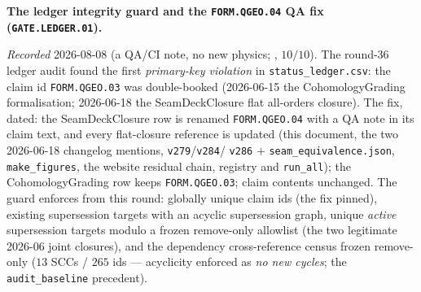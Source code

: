 \documentclass[11pt,a4paper]{article}
\begin{document}
\par\smallskip\noindent\textbf{The ledger integrity guard and
the \texttt{FORM.QGEO.04} QA fix (\texttt{GATE.LEDGER.01}).}
{\sloppy
\emph{Recorded} 2026-08-08 (a QA/CI note, no new physics;
, $10/10$).  The round-36
ledger audit found the first \emph{primary-key violation} in
\texttt{status\_ledger.csv}: the claim id \texttt{FORM.QGEO.03}
was double-booked (2026-06-15 the CohomologyGrading
formalisation; 2026-06-18 the SeamDeckClosure flat all-orders
closure).  The fix, dated: the SeamDeckClosure row is renamed
\texttt{FORM.QGEO.04} with a QA note in its claim text, and
every flat-closure reference is updated (this document, the two
2026-06-18 changelog mentions, \texttt{v279}/\texttt{v284}/%
\texttt{v286} $+$ \texttt{seam\_equivalence.json},
\texttt{make\_figures}, the website residual chain, registry
and \texttt{run\_all}); the CohomologyGrading row keeps
\texttt{FORM.QGEO.03}; claim contents unchanged.  The guard
enforces from this round: globally unique claim ids (the fix
pinned), existing supersession targets with an acyclic
supersession graph, unique \emph{active} supersession targets
modulo a frozen remove-only allowlist (the two legitimate
2026-06 joint closures), and the dependency cross-reference
census frozen remove-only ($13$ SCCs / $265$ ids ---
acyclicity enforced as \emph{no new cycles}; the
\texttt{audit\_baseline} precedent).\par}
\end{document}
